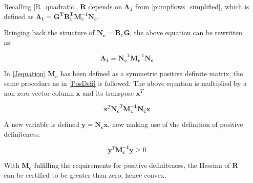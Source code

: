 Recalling \eqref{R_quadratic}, $\bm{R}$ depends on $\bm{\Lambda_1}$ from \eqref{pumpflows_simplified}, which is defined as $\bm{\Lambda_1} =\bm{G^T} \bm{B_{1}^T}\bm{M_c^{-1}}\bm{N_c}$.

Bringing back the structure of $\bm{N_c} = \bm{B_1} \bm{G}$, the above equation can be rewritten as:

\begin{equation}
\bm{\Lambda_1} =\bm{N_c}^{T} \bm{M_c^{-1}}\bm{N_c}
\end{equation}

In \eqref{Jequation} $\bm{M_c}$ has been defined as a symmetric positive definite matrix, the same procedure as in \eqref{PosDefi} is followed. The above equation is multiplied by a non-zero vector column $\bm{x}$ and its transpose $\bm{x}^{T}$

\begin{equation}
	\bm{x}^{T}\bm{N_c}^{T} \bm{M_c^{-1}}\bm{N_c}\bm{x}
\end{equation}

A new variable is defined $\bm{y} = \bm{N_c}\bm{x}$, now making use of the definition of positive definiteness: 

\begin{equation}
	\bm{y}^{T} \bm{M_c^{-1}} \bm{y} \geqslant 0
	\label{Def_Mc}
\end{equation}

 With $\bm{M_c}$ fulfilling the requirements for positive definiteness, the Hessian of $\bm{R}$ can be certified to be greater than zero, hence convex.






%
%
%
%
%



